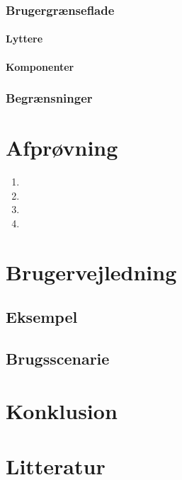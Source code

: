 \documentclass[final]{rapport1}
\begin{document}
\subsection{Brugergrænseflade}
\subsubsection{Lyttere}

\subsubsection{Komponenter}


\subsection{Begrænsninger}

\chapter{Afprøvning}

\begin{enumerate}
\item 
\item 
\item 
\item

\end{enumerate}

\chapter{Brugervejledning}
\section{Eksempel}

\section{Brugsscenarie}

\chapter{Konklusion}

\chapter{Litteratur}
\end{document}
